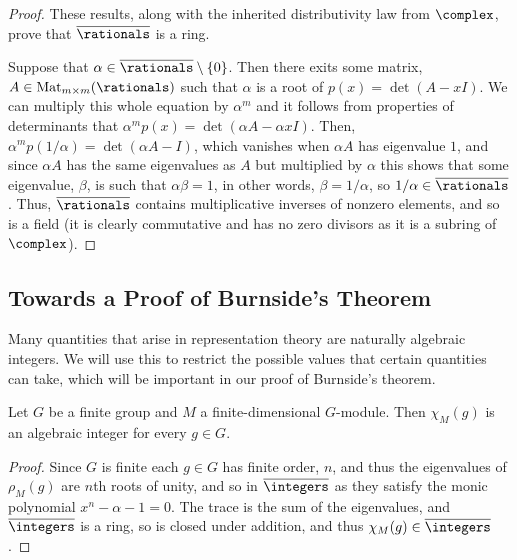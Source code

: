 \begin{prp}{}{}
\begin{proof}
        These results, along with the inherited distributivity law from \(\complex\), prove that \(\algNumbers\) is a ring.
        
        Suppose that \(\alpha \in \algNumbers \setminus \{0\}\).
        Then there exits some matrix, \(A \in \Mat_{m \times m}(\rationals)\) such that \(\alpha\) is a root of \(p(x) = \det(A - xI)\).
        We can multiply this whole equation by \(\alpha^m\) and it follows from properties of determinants that \(\alpha^m p(x) = \det(\alpha A - \alpha x I)\).
        Then, \(\alpha^m p(1/\alpha) = \det(\alpha A - I)\), which vanishes when \(\alpha A\) has eigenvalue \(1\), and since \(\alpha A\) has the same eigenvalues as \(A\) but multiplied by \(\alpha\) this shows that some eigenvalue, \(\beta\), is such that \(\alpha \beta = 1\), in other words, \(\beta = 1/\alpha\), so \(1/\alpha \in \algNumbers\).
        Thus, \(\algNumbers\) contains multiplicative inverses of nonzero elements, and so is a field  (it is clearly commutative and has no zero divisors as it is a subring of \(\complex\)).
    \end{proof}
\end{prp}

\subsection{Towards a Proof of Burnside's Theorem}
Many quantities that arise in representation theory are naturally algebraic integers.
We will use this to restrict the possible values that certain quantities can take, which will be important in our proof of Burnside's theorem.

\begin{lma}{}{}
    Let \(G\) be a finite group and \(M\) a finite-dimensional \(G\)-module.
    Then \(\chi_M(g)\) is an algebraic integer for every \(g \in G\).
    \begin{proof}
        Since \(G\) is finite each \(g \in G\) has finite order, \(n\), and thus the eigenvalues of \(\rho_M(g)\) are \(n\)th roots of unity, and so in \(\algIntegers\) as they satisfy the monic polynomial \(x^n - \alpha - 1 = 0\).
        The trace is the sum of the eigenvalues, and \(\algIntegers\) is a ring, so is closed under addition, and thus \(\chi_M(g) \in \algIntegers\).
    \end{proof}
\end{lma}

